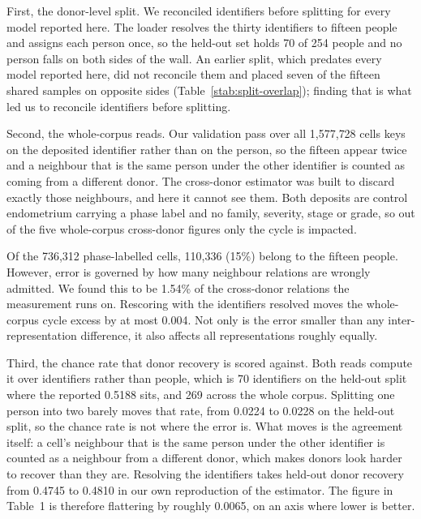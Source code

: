 First, the donor-level split. We reconciled identifiers before splitting
for every model reported here. The loader resolves the thirty identifiers
to fifteen people and assigns each person once, so the held-out set holds
70 of 254 people and no person falls on both sides of the wall. An earlier
split, which predates every model reported here, did not reconcile them and
placed seven of the fifteen shared samples on opposite sides
(Table~\ref{stab:split-overlap}); finding that is what led us to reconcile
identifiers before splitting.

Second, the whole-corpus reads. Our validation pass over all 1{,}577{,}728 
cells keys on the deposited identifier rather than on the person, so the fifteen
appear twice and a neighbour that is the same person under the other
identifier is counted as coming from a different donor. The cross-donor
estimator was built to discard exactly those neighbours, and here it
cannot see them. Both deposits are control endometrium carrying a phase 
label and no family, severity, stage or grade, so out of the five whole-corpus 
cross-donor figures only the cycle is impacted.

Of the 736{,}312 phase-labelled cells, 110{,}336 (15\%) belong to the 
fifteen people. However, error is governed by how many neighbour relations 
are wrongly admitted. We found this to be 1.54\% of the cross-donor relations 
the measurement runs on. Rescoring with the identifiers resolved moves the 
whole-corpus cycle excess by at most 0.004. Not only is the error smaller 
than any inter-representation difference, it also affects all representations
roughly equally.

Third, the chance rate that donor recovery is scored against. Both reads
compute it over identifiers rather than people, which is 70 identifiers on
the held-out split where the reported 0.5188 sits, and 269 across the whole
corpus. Splitting one person into two barely moves that rate, from 0.0224
to 0.0228 on the held-out split, so the chance rate is not where the error
is. What moves is the agreement itself: a cell's neighbour that is the same
person under the other identifier is counted as a neighbour from a
different donor, which makes donors look harder to recover than they are.
Resolving the identifiers takes held-out donor recovery from 0.4745 to
0.4810 in our own reproduction of the estimator. The figure in Table~1 is
therefore flattering by roughly 0.0065, on an axis where lower is
better.

\begin{table}[t]
\centering
\caption[The earlier split, sample by sample]{\textbf{The seven of fifteen
shared samples that an earlier donor-level split placed on different sides
of the wall.} Cell counts in parentheses. This split predates every model
reported here; it is the audit that led us to reconcile identifiers before
splitting.}
\label{stab:split-overlap}
\small

\end{table}

